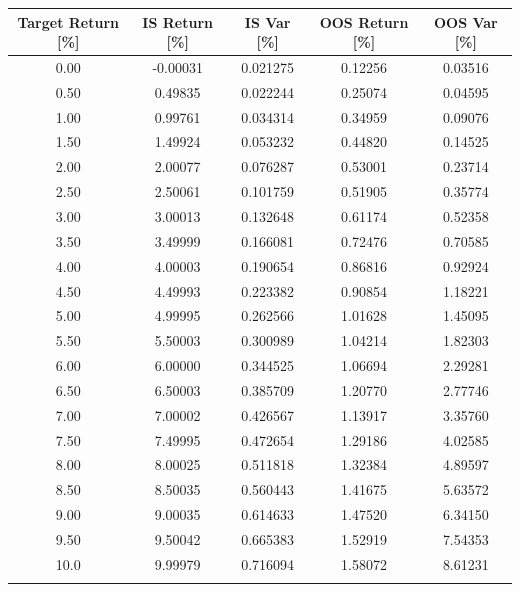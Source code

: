 \documentclass{article}
\begin{document}
\begin{table}[H]
\centering
\begin{tabular}{|c c c c c|} 
			\hline
			Target Return [\%] & IS Return  [\%]&	 IS Var [\%]  & OOS Return [\%]  & OOS Var [\%]  \\ [0.5ex] \hline \hline
			0.00  	 &	-0.00031  &	0.021275  	 &	0.12256  &	0.03516	\\ \hline
			0.50	 &	0.49835	  &	0.022244	 &	0.25074  &	0.04595	\\ \hline
			1.00	 &	0.99761   &	0.034314  	 &	0.34959  &	0.09076	\\ \hline
			1.50	 &	1.49924	  &	0.053232  	 &	0.44820  &	0.14525	\\ \hline
			2.00	 &	2.00077	  &	0.076287  	 &	0.53001  &	0.23714	\\ \hline
			2.50	 &	2.50061	  &	0.101759	 &	0.51905  &	0.35774		\\ \hline
			3.00	 &	3.00013	  &	0.132648	 &	0.61174  &	0.52358		\\ \hline
			3.50	 &	3.49999	  &	0.166081	 &	0.72476  &	0.70585		\\ \hline
			4.00	 &	4.00003	  &	0.190654	 &	0.86816  &	0.92924		\\ \hline
			4.50	 &	4.49993	  &	0.223382	 &	0.90854  &	1.18221		\\ \hline
			5.00	 &	4.99995	  &	0.262566	 &	1.01628	 &	1.45095		\\ \hline
			5.50	 &	5.50003	  &	0.300989	 &	1.04214	 &	1.82303		\\ \hline
			6.00	 &	6.00000	  &	0.344525	 &	1.06694	 &	2.29281		\\ \hline
			6.50	 &	6.50003	  &	0.385709	 &	1.20770	 &	2.77746		\\ \hline
			7.00	 &	7.00002	  &	0.426567	 &	1.13917	 &	3.35760		\\ \hline
			7.50	 &	7.49995	  &	0.472654	 &	1.29186	 &	4.02585		\\ \hline
			8.00	 &	8.00025	  &	0.511818	 &	1.32384	 &	4.89597		\\ \hline
			8.50 	 &	8.50035	  &	0.560443	 &	1.41675	 &	5.63572		\\ \hline
			9.00	 &	9.00035	  &	0.614633	 &	1.47520	 &	6.34150		\\ \hline
			9.50	 &	9.50042	  &	0.665383	 &	1.52919	 &	7.54353		\\ \hline
			10.0 	 &	9.99979	  &	0.716094	 &	1.58072	 &	8.61231 \\ [1ex]  \hline

\label{table:port_results}
\end{tabular}
\end{table}
\end{document}
